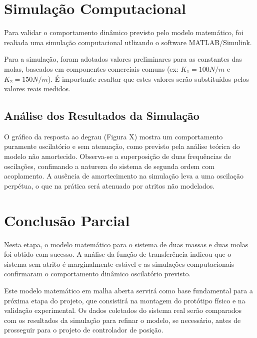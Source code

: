 \documentclass[9pt,a4paper,twocolumn,twoside]{tau-class/tau}
\begin{document}
\section{Simulação Computacional}

Para validar o comportamento dinâmico previsto pelo modelo matemático, foi realiada uma simulação computacional utlizando o software MATLAB/Simulink.

Para a simulação, foram adotados valores preliminares para as constantes das molas, baseados em componentes comerciais comuns (ex: $K_1 = 100N/m$ e $K_2 = 150N/m$). É importante resaltar que estes valores serão substituídos pelos valores reais medidos.

\subsection{Análise dos Resultados da Simulação}
O gráfico da resposta ao degrau (Figura X) mostra um comportamento puramente oscilatório e sem atenuação, como previsto pela análise teórica do modelo não amortecido. Observa-se a superposição de duas frequências de oscilações, confimando a natureza do sistema de segunda ordem com acoplamento. A ausência de amortecimento na simulação leva a uma oscilação perpétua, o que na prática será atenuado por atritos não modelados.

\section{Conclusão Parcial}

Nesta etapa, o modelo matemático para o sistema de duas massas e duas molas foi obtido com sucesso. A análise da função de transferência indicou que o sistema sem atrito é marginalmente estável e as simulações computacionais confirmaram o comportamento dinâmico oscilatório previsto.

Este modelo matemático em malha aberta servirá como base fundamental para a próxima etapa do projeto, que consistirá na montagem do protótipo físico e na validação experimental. Os dados coletados do sistema real serão comparados com os resultados da simulação para refinar o modelo, se necessário, antes de prosseguir para o projeto de controlador de posição.



\printbibliography

\end{document}

